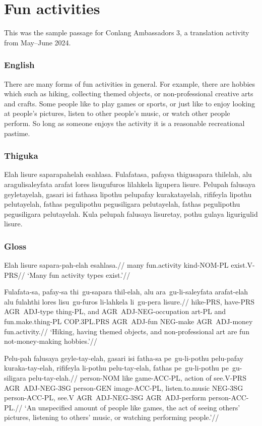 

\chapter{Fun activities}
This was the sample passage for Conlang Ambassadors 3, a translation activity from May--June 2024.
\subsection*{English}
There are many forms of fun activities in general.
For example, there are hobbies which such as hiking, collecting themed objects, or non-professional creative arts and crafts.
Some people like to play games or sports, or just like to enjoy looking at people's pictures, listen to other people's music, or watch other people perform.
So long as someone enjoys the activity it is a reasonable recreational pastime.

\subsection*{Thiguka}
Elah lisure saparapahelah esahlasa.
Fulafatasa, pafaysa thigusapara thilelah, alu aragulisaleyfata arafat lores lisugufuros lilahkela ligupera lisure.
Pelupah falusaya geyletayelah, gasari isi fathasa lipothu pelupafay kurakatayelah, rififeyla lipothu pelutayelah, fathas pegulipothu pegusiligara pelutayelah, fathas pegulipothu pegusiligara pelutayelah.
Kula pelupah falusaya lisuretay, pothu gulaya ligurigulid lisure.

\newpage

\subsection*{Gloss}
\ex
\begingl
\gla Elah lisure sapara-pah-elah esahlasa.//
\glb many fun.activity kind-NOM-PL exist.V-PRS//
\glft `Many fun activity types exist.'//
\endgl
\xe

\ex
\begingl
\gla  Fulafata-sa, pafay-sa thi~gu-sapara thil-elah, alu ara~gu-li-saleyfata arafat-elah alu fulahthi lores lisu~gu-furos li-lahkela li~gu-pera lisure.//
\glb  hike-PRS, have-PRS AGR~ADJ-type thing-PL, and AGR~ADJ-NEG-occupation art-PL and fun.make.thing-PL COP.3PL.PRS AGR~ADJ-fun NEG-make AGR~ADJ-money fun.activity.//
\glft `Hiking, having themed objects, and non-professional art are fun not-money-making hobbies.'//
\endgl
\xe

\ex
\begingl
\gla  Pelu-pah falusaya geyle-tay-elah, gasari isi fatha-sa pe~gu-li-pothu pelu-pafay kuraka-tay-elah, rififeyla li-pothu pelu-tay-elah, fathas pe~gu-li-pothu pe~gu-siligara pelu-tay-elah.//
\glb   person-NOM like game-ACC-PL, action of see.V-PRS AGR~ADJ-NEG-3SG person-GEN image-ACC-PL, listen.to.music NEG-3SG person-ACC-PL, see.V AGR~ADJ-NEG-3SG AGR~ADJ-perform person-ACC-PL.//
\glft `An unspecified amount of people like games, the act of seeing others' pictures, listening to others' music, or watching performing people.'//
\endgl
\xe


